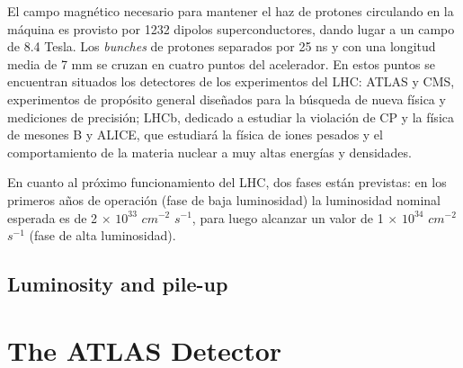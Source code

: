    El campo magn\'etico necesario para mantener el haz de protones circulando en la m\'aquina es provisto por 1232 dipolos superconductores, dando lugar a un campo de 8.4 Tesla. Los \emph{bunches} de protones separados por 25 ns y con una longitud media de 7 mm se cruzan en cuatro puntos del acelerador. En estos puntos se encuentran situados los detectores de los experimentos del LHC: ATLAS y CMS, experimentos de prop\'osito general dise\~nados para la b\'usqueda de nueva f\'isica y mediciones de precisi\'on; LHCb, dedicado a estudiar la violaci\'on de CP y la f\'isica de mesones B y ALICE, que estudiar\'a la f\'isica de iones pesados y el comportamiento de la materia nuclear a muy altas energ\'ias y densidades.

   En cuanto al pr\'oximo funcionamiento del LHC, dos fases est\'an previstas: en los primeros a\~nos de operaci\'on (fase de baja luminosidad) la luminosidad nominal esperada es de 2 $\times$ $10^{33}$ $cm^{-2}$ $s^{-1}$, para luego alcanzar un valor de 1 $\times$ $10^{34}$ $cm^{-2}$ $s^{-1}$ (fase de alta luminosidad). 


\section{Luminosity and pile-up}\label{sec:lumiintro}




%
%
\chapter{The ATLAS Detector}

